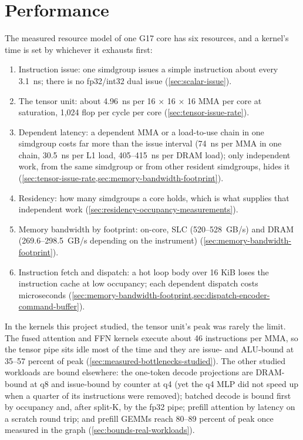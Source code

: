 \chapter{Performance}\label{ch:performance}

The measured resource model of one G17 core has six resources, and a kernel's time is set by whichever it
exhausts first:

\begin{enumerate}
\def\labelenumi{\arabic{enumi}.}
\item Instruction issue: one simdgroup issues a simple instruction about every 3.1~ns; there is no fp32/int32 dual
  issue (\cref{sec:scalar-issue}).
\item The tensor unit: about 4.96~ns per 16 × 16 × 16 MMA per core at saturation, 1,024 flop per cycle per core
  (\cref{sec:tensor-issue-rate}).
\item Dependent latency: a dependent MMA or a load-to-use chain in one simdgroup costs far more than the issue
  interval (74~ns per MMA in one chain, 30.5~ns per L1 load, 405–415~ns per DRAM load); only independent work, from
  the same simdgroup or from other resident simdgroups, hides it (\cref{sec:tensor-issue-rate,sec:memory-bandwidth-footprint}).
\item Residency: how many simdgroups a core holds, which is what supplies that independent work (\cref{sec:residency-occupancy-measurements}).
\item Memory bandwidth by footprint: on-core, SLC (520–528~GB/s) and DRAM (269.6–298.5~GB/s depending on the
  instrument) (\cref{sec:memory-bandwidth-footprint}).
\item Instruction fetch and dispatch: a hot loop body over 16 KiB loses the instruction cache at low occupancy; each
  dependent dispatch costs microseconds (\cref{sec:memory-bandwidth-footprint,sec:dispatch-encoder-command-buffer}).
\end{enumerate}

In the kernels this project studied, the tensor unit's peak was rarely the limit. The fused attention and FFN kernels execute about 46 instructions per MMA, so the tensor pipe sits
idle most of the time and they are issue- and ALU-bound at 35–57 percent of peak (\cref{sec:measured-bottlenecks-studied}). The other
studied workloads are bound elsewhere: the one-token decode projections are DRAM-bound at q8 and
issue-bound by counter at q4 (yet the q4 MLP did not speed up when a quarter of its instructions were removed);
batched decode is bound first by occupancy and, after split-K, by the fp32 pipe; prefill attention by latency on a
scratch round trip; and prefill GEMMs reach 80–89 percent of peak once measured in the graph (\cref{sec:bounds-real-workloads}).


